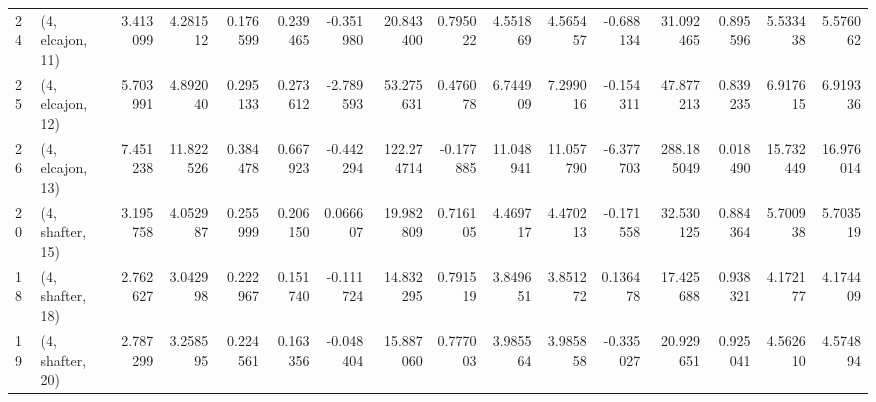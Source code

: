 \begin{tabular}{llrrrrrrrrrrrrrr}
24 &  (4, elcajon, 11) &  3.413099 &   4.281512 &   0.176599 &  0.239465 & -0.351980 &   20.843400 &  0.795022 &   4.551869 &   4.565457 & -0.688134 &   31.092465 &  0.895596 &   5.533438 &   5.576062 \\
25 &  (4, elcajon, 12) &  5.703991 &   4.892040 &   0.295133 &  0.273612 & -2.789593 &   53.275631 &  0.476078 &   6.744909 &   7.299016 & -0.154311 &   47.877213 &  0.839235 &   6.917615 &   6.919336 \\
26 &  (4, elcajon, 13) &  7.451238 &  11.822526 &   0.384478 &  0.667923 & -0.442294 &  122.274714 & -0.177885 &  11.048941 &  11.057790 & -6.377703 &  288.185049 &  0.018490 &  15.732449 &  16.976014 \\
20 &  (4, shafter, 15) &  3.195758 &   4.052987 &   0.255999 &  0.206150 &  0.066607 &   19.982809 &  0.716105 &   4.469717 &   4.470213 & -0.171558 &   32.530125 &  0.884364 &   5.700938 &   5.703519 \\
18 &  (4, shafter, 18) &  2.762627 &   3.042998 &   0.222967 &  0.151740 & -0.111724 &   14.832295 &  0.791519 &   3.849651 &   3.851272 &  0.136478 &   17.425688 &  0.938321 &   4.172177 &   4.174409 \\
19 &  (4, shafter, 20) &  2.787299 &   3.258595 &   0.224561 &  0.163356 & -0.048404 &   15.887060 &  0.777003 &   3.985564 &   3.985858 & -0.335027 &   20.929651 &  0.925041 &   4.562610 &   4.574894 \\
\bottomrule
\end{tabular}
